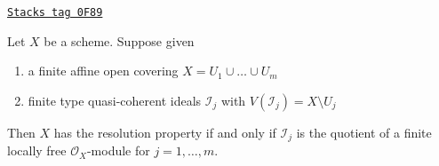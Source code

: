 \begin{lemma}
\label{perfect-lemma-resolution-property-finite-number}
\href{https://stacks.math.columbia.edu/tag/0F89}{\texttt{Stacks tag 0F89}}

Let $X$ be a scheme. Suppose given
\begin{enumerate}
\item a finite affine open covering $X = U_1 \cup \ldots \cup U_m$
\item finite type quasi-coherent ideals $\mathcal{I}_j$
with $V(\mathcal{I}_j) = X \setminus U_j$
\end{enumerate}
Then $X$ has the resolution property if and only if $\mathcal{I}_j$
is the quotient of a finite locally free $\mathcal{O}_X$-module
for $j = 1, \ldots, m$.
\end{lemma}

